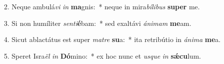 2. Neque ambulá\textit{vi} \textit{in} \textbf{ma}gnis:~*  neque in mira\textit{bí}\textit{li}\textit{bus} \textbf{su}\textbf{per} me.\

3. Si non humíliter \textit{sen}\textit{ti}\textbf{é}bam:~*  sed exaltávi \textit{á}\textit{ni}\textit{mam} \textbf{me}am.\

4. Sicut ablactátus est super \textit{ma}\textit{tre} \textbf{su}a:~*  ita retribútio in \textit{á}\textit{ni}\textit{ma} \textbf{me}a.\

5. Speret Isra\textit{ël} \textit{in} \textbf{Dó}mino:~*  ex hoc nunc et \textit{us}\textit{que} \textit{in} \textbf{sǽ}\textbf{cu}lum.\

